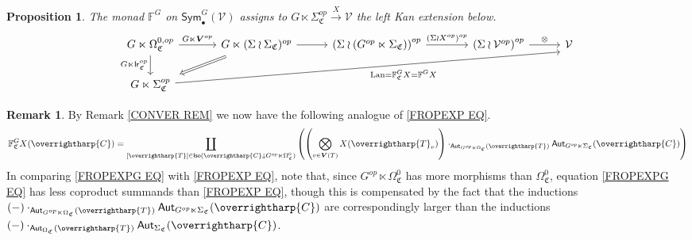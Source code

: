 \documentclass[a4paper,10pt
,draft
]{article}%
\numberwithin{equation}{section}
\numberwithin{figure}{section}
\newtheorem{proposition}[equation]{Proposition}%
\theoremstyle{definition} %
\newtheorem{remark}[equation]{Remark}%
\newcommand{\vect}[1]{\text{\overrightharp{\ensuremath{#1}}}}
\DeclareMathOperator{\Lan}{Lan}%
\newcommand{\V}{\ensuremath{\mathcal V}}
\newcommand{\1}{\ensuremath{\mathbbm 1}}%
\begin{document}
\begin{proposition}\label{FGC PROP}
	The monad $\mathbb{F}^G$ on $\mathsf{Sym}^G_{\bullet}(\V)$
	assigns to 
	$G \ltimes \Sigma^{op}_{\mathfrak{C}} \xrightarrow{X} \V$
	the left Kan extension below.
	\begin{equation}\label{FGC_EQ}
	\begin{tikzcd}[column sep = 28pt]
	G \ltimes \Omega^{0,op}_{\mathfrak{C}}
	\arrow[d, "G \ltimes \mathsf{lr}_{\mathfrak C}^{op}"']
	\arrow[r, "G \ltimes \boldsymbol{V}^{op}"]
	&[6pt]
	G \ltimes (\Sigma \wr \Sigma_{\mathfrak{C}})^{op} \arrow{r}
	\arrow[dl, Rightarrow, shorten >=0.15cm,shorten <=0.15cm]
	&
	\left( \Sigma \wr \left( G^{op} \ltimes \Sigma_{\mathfrak{C}} \right) \right)^{op}
	\arrow[r, "(\Sigma \wr X^{op})^{op}"]
	&[10pt]
	\left(\Sigma \wr \V^{op}\right)^{op} \arrow[r, "\otimes"]
	&
	\V
	\\
	G \ltimes \Sigma^{op}_{\mathfrak{C}}
	\arrow[urrrr, "\Lan = \mathbb F_{\mathfrak{C}}^G X = \mathbb F^G X"', end anchor = south west]
	\end{tikzcd}
	\end{equation}
\end{proposition}







\begin{remark}\label{FROPEXPG REM}
	By Remark \ref{CONVER REM} we now have the following analogue of
	\eqref{FROPEXP EQ}.
	\begin{equation}\label{FROPEXPG EQ}
	\mathbb{F}^G_{\mathfrak{C}} X (\vect{C})
	=
	\coprod_{[\vect{T}] \in 
		\mathsf{Iso}(\vect{C} \downarrow G^{op} \ltimes \Omega^0_{\mathfrak{C}})}
	\left(
	\left(
	\bigotimes_{v \in \boldsymbol{V}(T)} X(\vect{T}_v)
	\right)
	\cdot_{\mathsf{Aut}_{G^{op} \ltimes \Omega_{\mathfrak{C}}}(\vect{T})}
	\mathsf{Aut}_{G^{op} \ltimes \Sigma_{\mathfrak{C}}}(\vect{C})
	\right)
	\end{equation}
	In comparing \eqref{FROPEXPG EQ} with \eqref{FROPEXP EQ},
	note that,
	since $G^{op} \ltimes \Omega^0_{\mathfrak{C}}$
	has more morphisms than
	$\Omega^0_{\mathfrak{C}}$,
	equation \eqref{FROPEXPG EQ} has less coproduct summands than \eqref{FROPEXP EQ},
	though this is compensated by the fact that the inductions
	$(-)\cdot_{\mathsf{Aut}_{G^{op} \ltimes \Omega_{\mathfrak{C}}}(\vect{T})}
	\mathsf{Aut}_{G^{op} \ltimes \Sigma_{\mathfrak{C}}}(\vect{C})$
	are correspondingly larger than the inductions
	$(-)\cdot_{\mathsf{Aut}_{\Omega_{\mathfrak{C}}}(\vect{T})}
	\mathsf{Aut}_{\Sigma_{\mathfrak{C}}}(\vect{C})$.
\end{remark}
\end{document}
